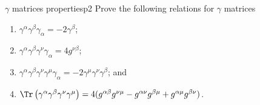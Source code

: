 \begin{problem}{\(\gamma\) matrices properties}{p2}
   Prove the following relations for \(\gamma\) matrices
   \begin{enumerate}[label=(\alph*)]
       \item \(\gamma^\alpha \gamma^\beta \gamma_\alpha = - 2\gamma^\beta\);
       \item \(\gamma^\alpha \gamma^\beta \gamma^\nu \gamma_\alpha = 4 g^{\nu \beta}\);
       \item \(\gamma^\alpha \gamma^\beta \gamma^\nu \gamma^\mu \gamma_\alpha = -2 \gamma^\mu \gamma^\nu \gamma^\beta\); and
       \item \(\Tr\left(\gamma^\alpha \gamma^\beta \gamma^\nu \gamma^\mu\right) = 4(g^{\alpha \beta} g^{\nu \mu} - g^{\alpha \nu} g^{\beta \mu} + g^{\alpha \mu} g^{\beta \nu})\).
   \end{enumerate}
\end{problem}
